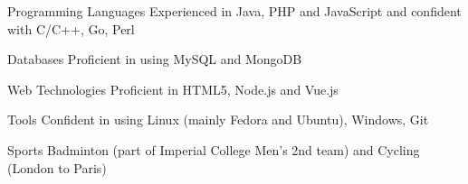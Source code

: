 \documentclass[a4paper]{article}
\begin{document}
\vspace{6pt}

\begin{eqlist}
    \item[Programming Languages] Experienced in Java, PHP and JavaScript and confident with C/C++, Go, Perl
    \item[Databases] Proficient in using MySQL and MongoDB
    \item[Web Technologies] Proficient in HTML5, Node.js and Vue.js
    \item[Tools] Confident in using Linux (mainly Fedora and Ubuntu), Windows, Git
    \item[Sports] Badminton (part of Imperial College Men's 2nd team) and Cycling (London to Paris)
\end{eqlist}
\end{document}

